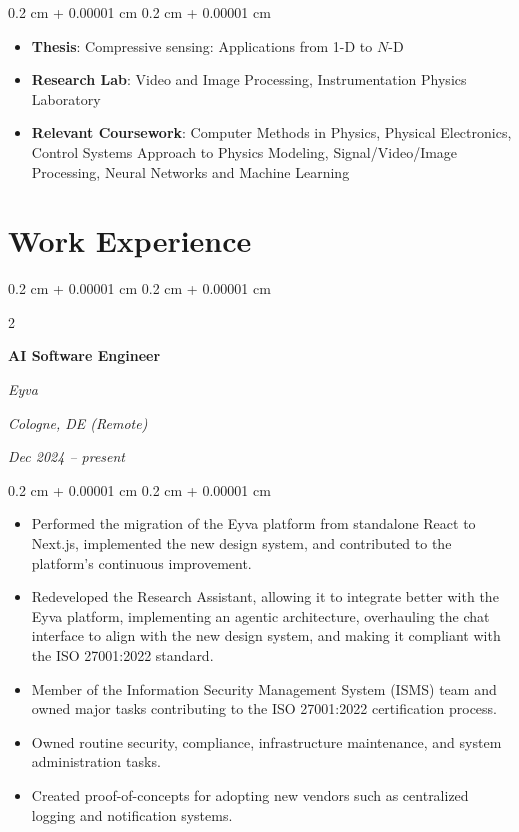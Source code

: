 \documentclass[10pt, a4paper]{article}
\newenvironment{highlights}{
    \begin{itemize}[
        topsep=0.10 cm,
        parsep=0.10 cm,
        partopsep=0pt,
        itemsep=0pt,
        leftmargin=0.4 cm + 10pt
    ]
}{
    \end{itemize}
} %
\newenvironment{onecolentry}{
    \begin{adjustwidth}{
        0.2 cm + 0.00001 cm
    }{
        0.2 cm + 0.00001 cm
    }
}{
    \end{adjustwidth}
} %
\newenvironment{twocolentry}[2][]{
    \onecolentry
    \def\secondColumn{#2}
    \setcolumnwidth{\fill, 4.5 cm}
    \begin{paracol}{2}
}{
    \switchcolumn \raggedleft \secondColumn
    \end{paracol}
    \endonecolentry
} %
\begin{document}
        \vspace{0.10 cm}
        \begin{onecolentry}
            \begin{highlights}
                \item \textbf{Thesis}: Compressive sensing: Applications from 1-D to $N$-D
                \item \textbf{Research Lab}: Video and Image Processing, Instrumentation Physics Laboratory
                \item \textbf{Relevant Coursework}: Computer Methods in Physics, Physical Electronics,  Control Systems Approach to Physics Modeling, Signal/Video/Image Processing, Neural Networks and Machine Learning

            \end{highlights}
        \end{onecolentry}



    
    \section{Work Experience}



        
        \begin{twocolentry}{
        \textit{Cologne, DE (Remote)}    
            
        \textit{Dec 2024 – present}}
            \textbf{AI Software Engineer}
            
            \textit{Eyva}
        \end{twocolentry}

        \vspace{0.10 cm}
        \begin{onecolentry}
            \begin{highlights}
                \item Performed the migration of the Eyva platform from standalone React to Next.js, implemented the new design system, and contributed to the platform's continuous improvement.
                \item Redeveloped the Research Assistant, allowing it to integrate better with the Eyva platform, implementing an agentic architecture, overhauling the chat interface to align with the new design system, and making it compliant with the ISO 27001:2022 standard.
                \item Member of the Information Security Management System (ISMS) team and owned major tasks contributing to the ISO 27001:2022 certification process.

                \item Owned routine security, compliance, infrastructure maintenance, and system administration tasks.
                \item Created proof-of-concepts for adopting new vendors such as centralized logging and notification systems.
            \end{highlights}
        \end{onecolentry}
\end{document}

